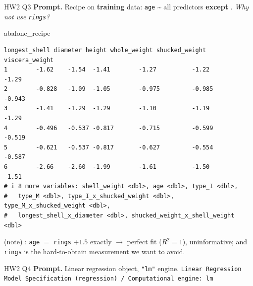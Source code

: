 \begin{qbox}{HW2 Q3}
\textbf{Prompt.} Recipe on \textbf{training} data: \texttt{age} \textasciitilde{} all predictors \textbf{except} . \emph{Why not use \texttt{rings}?}
\mine
\begin{rcode}
abalone_recipe %
\end{rcode}
\begin{lstlisting}[style=cs/rout,basicstyle=\ttfamily\scriptsize]
  longest_shell diameter height whole_weight shucked_weight viscera_weight
1        -1.62    -1.54  -1.41        -1.27          -1.22          -1.29
2        -0.828   -1.09  -1.05        -0.975         -0.985         -0.943
3        -1.41    -1.29  -1.29        -1.10          -1.19          -1.29
4        -0.496   -0.537 -0.817       -0.715         -0.599         -0.519
5        -0.621   -0.537 -0.817       -0.627         -0.554         -0.587
6        -2.66    -2.60  -1.99        -1.61          -1.50          -1.51
# i 8 more variables: shell_weight <dbl>, age <dbl>, type_I <dbl>,
#   type_M <dbl>, type_I_x_shucked_weight <dbl>, type_M_x_shucked_weight <dbl>,
#   longest_shell_x_diameter <dbl>, shucked_weight_x_shell_weight <dbl>
\end{lstlisting}
\ans (note) : \texttt{age} $=$ \texttt{rings} $+1.5$ exactly $\to$ perfect fit ($R^2=1$), uninformative; and \texttt{rings} is the hard-to-obtain measurement we want to avoid.
\end{qbox}

\begin{qbox}{HW2 Q4}
\textbf{Prompt.} Linear regression object, \texttt{"lm"} engine.
\mine \texttt{Linear Regression Model Specification (regression) / Computational engine: lm}
\end{qbox}

